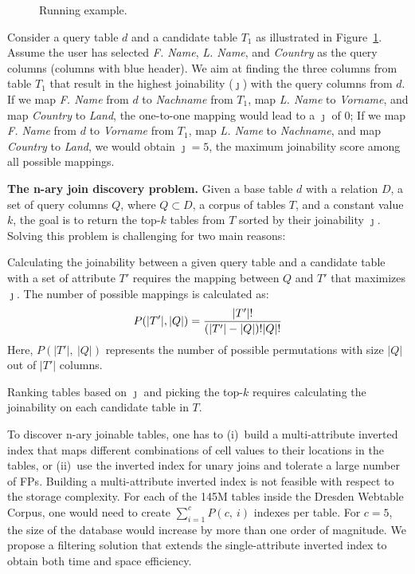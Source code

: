 \begin{figure}
	\caption{Running example.}
    \label{fig:example}
\end{figure}

Consider a query table $d$ and a candidate table $T_1$ as illustrated in Figure~\ref{fig:example}.
Assume the user has selected \textit{F. Name}, \textit{L. Name}, and \textit{Country} as the query columns (columns with blue header).
We aim at finding the three columns from table $T_1$ that result in the highest joinability ($\jmath$) with the query columns from $d$.
If we map \textit{F. Name} from $d$ to \textit{Nachname} from $T_1$, map \textit{L. Name} to \textit{Vorname}, and map \textit{Country} to \textit{Land}, the one-to-one mapping would lead to a $\jmath$ of $0$;
If we map \textit{F. Name} from $d$ to \textit{Vorname} from $T_1$, map \textit{L. Name} to \textit{Nachname}, and map \textit{Country} to \textit{Land}, we would obtain $\jmath=5$, the maximum joinability score among all possible mappings.

\noindent\textbf{The n-ary join discovery problem.} Given a base table $d$ with a relation $D$,
a set of query columns $Q$, where $Q \subset D$, a corpus of tables $T$, and a constant value $k$, the goal is to return the top-$k$ tables from $T$ sorted by their joinability $\jmath$.
Solving this problem is challenging for two main reasons:
\begin{packed_enum}
    \item Calculating the joinability between a given query table and a candidate table with a set of attribute $T'$ requires the mapping between $Q$ and $T'$ that maximizes $\jmath$.
    The number of possible mappings is calculated as:
        \begin{equation}
        \small
           P(|T'|, |Q|) = \frac{|T'|!}{(|T'| - |Q|)! |Q|!}
        \end{equation}
        Here, $P(|T'|,\ |Q|)$ represents the number of possible permutations with size $|Q|$ out of $|T'|$ columns.
    \item Ranking tables based on $\jmath$ and picking the top-$k$ requires calculating the joinability on each candidate table in $T$. 
\end{packed_enum}


To discover n-ary joinable tables, one has to (i)~build a multi-attribute inverted index that maps different combinations of cell values to their locations in the tables, or (ii)~use the inverted index for unary joins and tolerate a large number of FPs.
Building a multi-attribute inverted index is not feasible with respect to the storage complexity.
For each of the 145M tables inside the Dresden Webtable Corpus, one would need to create $\sum_{i=1}^{c} P(c,\ i)$ indexes per table.
For $c=5$, the size of the database would increase by more than one order of magnitude.
We propose a filtering solution that extends the single-attribute inverted index to obtain both time and space efficiency.
